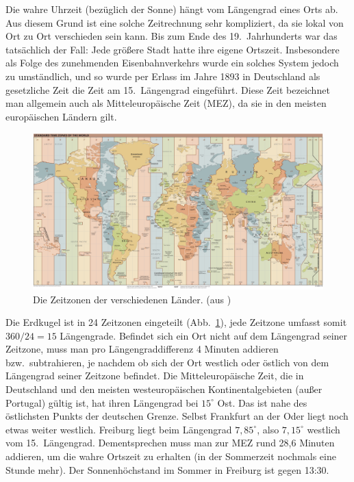 Die wahre Uhrzeit (bez\"uglich der Sonne) h\"angt vom L\"angengrad eines Orts ab.
Aus diesem Grund ist eine solche Zeitrechnung sehr kompliziert, da sie lokal von Ort zu Ort
verschieden sein kann. Bis zum Ende des 19.\ Jahrhunderts war das tats\"achlich der Fall:
Jede gr\"o\ss ere Stadt hatte ihre eigene Ortszeit. Insbesondere als Folge des
zunehmenden Eisenbahnverkehrs wurde ein solches System jedoch zu
umst\"andlich, und so wurde per Erlass im Jahre 1893 in Deutschland als gesetzliche
Zeit die Zeit am 15.\ L\"angengrad eingef\"uhrt. Diese Zeit bezeichnet man allgemein
auch als \glqq Mitteleurop\"aische Zeit (MEZ)\grqq, da 
sie in den meisten europ\"aischen L\"andern gilt. 

\begin{figure}[htb]
\includegraphics[scale=0.18]{./Bilder/World_Time_Zones_Map.png}
\caption{\label{fig_Zeitzonen}%
Die Zeitzonen der verschiedenen L\"ander. (aus \cite{Wikipedia_Zeitzone})}
\end{figure}

Die Erdkugel ist in 24 Zeitzonen eingeteilt (Abb.\ \ref{fig_Zeitzonen}), jede Zeitzone umfasst 
somit $360/24=15$ L\"angengrade. Befindet sich ein Ort nicht auf dem L\"angengrad seiner Zeitzone, muss 
man pro L\"angengraddifferenz 4 Minuten addieren bzw.\ subtrahieren, je nachdem ob sich der
Ort westlich oder \"ostlich von dem L\"angengrad seiner Zeitzone befindet. Die Mitteleurop\"aische
Zeit, die in Deutschland und den meisten westeurop\"aischen Kontinentalgebieten (au\ss er Portugal)
g\"ultig ist, hat ihren L\"angengrad bei $15^\circ$ Ost. Das ist nahe des
\"ostlichsten Punkts der deutschen Grenze. Selbst Frankfurt an der Oder liegt noch etwas weiter
westlich. Freiburg 
liegt beim L\"angengrad $7,85^\circ$, also $7,15^\circ$ westlich vom 15.\
L\"angengrad. Dementsprechen muss man zur MEZ rund 28,6 Minuten addieren, um die
wahre Ortszeit zu erhalten (in der Sommerzeit nochmals eine Stunde mehr). Der Sonnenh\"ochstand
im Sommer in Freiburg ist gegen 13:30.   

